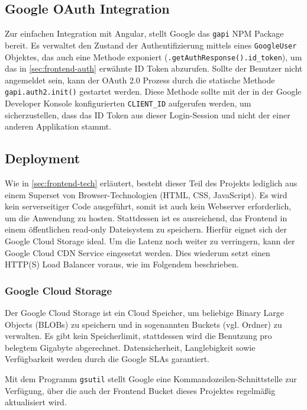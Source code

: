 \documentclass{article}
\begin{document}
\subsection{Google OAuth Integration}

Zur einfachen Integration mit Angular, stellt Google das \texttt{gapi} NPM Package bereit. Es verwaltet den Zustand der Authentifizierung mittels eines \texttt{GoogleUser} Objektes, das auch eine Methode exponiert (\texttt{.getAuthResponse().id\_token}), um das in \autoref{sec:frontend-auth} erwähnte ID Token abzurufen. Sollte der Benutzer nicht angemeldet sein, kann der OAuth 2.0 Prozess durch die statische Methode \texttt{gapi.auth2.init()} gestartet werden. Diese Methode sollte mit der in der Google Developer Konsole konfigurierten \texttt{CLIENT\_ID} aufgerufen werden, um sicherzustellen, dass das ID Token aus dieser Login-Session und nicht der einer anderen Applikation stammt. 


\subsection{Deployment}

Wie in \autoref{sec:frontend-tech} erläutert, besteht dieser Teil des Projekts lediglich aus einem Superset von Browser-Technologien (HTML, CSS, JavaScript). Es wird kein serverseitiger Code ausgeführt, somit ist auch kein Webserver erforderlich, um die Anwendung zu hosten. Stattdessen ist es ausreichend, das Frontend in einem öffentlichen read-only Dateisystem zu speichern. Hierfür eignet sich der Google Cloud Storage ideal. Um die Latenz noch weiter zu verringern, kann der Google Cloud CDN Service eingesetzt werden. Dies wiederum setzt einen HTTP(S) Load Balancer voraus, wie im Folgendem beschrieben. 


\subsubsection{Google Cloud Storage}

Der Google Cloud Storage ist ein Cloud Speicher, um beliebige Binary Large Objects (BLOBs) zu speichern und in sogenannten Buckets (vgl. Ordner) zu verwalten. Es gibt kein Speicherlimit, stattdessen wird die Benutzung pro belegtem Gigabyte abgerechnet. Datensicherheit, Langlebigkeit sowie Verfügbarkeit werden durch die Google SLAs garantiert.

Mit dem Programm \texttt{gsutil} stellt Google eine Kommandozeilen-Schnittstelle zur Verfügung, über die auch der Frontend Bucket dieses Projektes regelmäßig aktualisiert wird.
\end{document}
